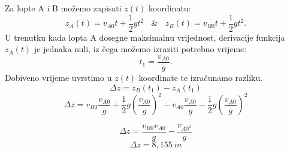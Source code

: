 
Za lopte A i B možemo zapisati $z(t)$ koordinatu: 
$$ z_A(t)=v_{A0}t + \frac{1}{2}gt^2\ \ \ \ \& \ \ \ \  z_B(t)=v_{B0}t + \frac{1}{2}gt^2. $$
U trenutku kada lopta A dosegne maksimalnu vrijednost, derivacije funkcija  $ z_A(t)$ je jednaka nuli, iz čega možemo izraziti potrebno vrijeme:
$$t_1=\frac{v_{A0}}{g} .$$
Dobiveno vrijeme uvrstimo u $z(t)$ koordinate te izračunamo razliku.
$$ \Delta z= z_B(t_1)-z_A(t_1)$$
$$ \Delta z=v_{B0}\frac{v_{A0}}{g} + \frac{1}{2}g\left( \frac{v_{A0}}{g} \right) ^2 - v_{A0}\frac{v_{A0}}{g} - \frac{1}{2}g\left( \frac{v_{A0}}{g} \right) ^2$$

$$\Delta z=\frac{v_{B0}v_{A0}}{g}  - \frac{v_{A0^2}}{g} $$
$$\Delta z=8,155\ m$$
